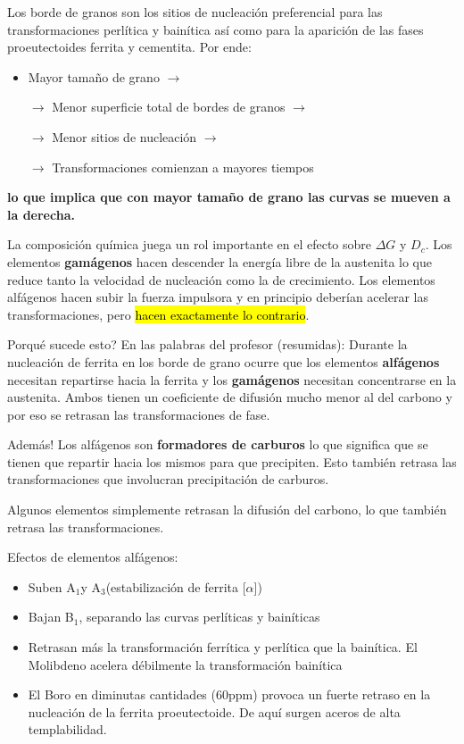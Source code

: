 \documentclass{article}
\newcommand{\Bs}{B\ensuremath{_{1}}}
\newcommand{\Aone}{A\ensuremath{_{1}}}
\newcommand{\Athree}{A\ensuremath{_{3}}}
\newcommand{\goright}{\ensuremath{\rightarrow}}
\begin{document}
Los borde de granos son los sitios de nucleación preferencial para las transformaciones perlítica y bainítica así como para la aparición de las fases proeutectoides ferrita y cementita. Por ende:
\begin{itemize}
    \item Mayor tamaño de grano \goright
    \item[\goright] Menor superficie total de bordes de granos \goright
    \item[\goright] Menor sitios de nucleación \goright
    \item[\goright] Transformaciones comienzan a mayores tiempos
\end{itemize}
\textbf{lo que implica que con mayor tamaño de grano las curvas se mueven a la derecha.}

La composición química juega un rol importante en el efecto sobre $\Delta G$ y $D_c$. Los elementos \textbf{gamágenos} hacen descender la energía libre de la austenita lo que reduce tanto la velocidad de nucleación como la de crecimiento. Los elementos alfágenos hacen subir la fuerza impulsora y en principio deberían acelerar las transformaciones, pero \hl{hacen exactamente lo contrario}.

Porqué sucede esto? En las palabras del profesor (resumidas): Durante la nucleación de ferrita en los borde de grano ocurre que los elementos \textbf{alfágenos} necesitan repartirse hacia la ferrita y los \textbf{gamágenos} necesitan concentrarse en la austenita. Ambos tienen un coeficiente de difusión mucho menor al del carbono y por eso se retrasan las transformaciones de fase.

Además! Los alfágenos son \textbf{formadores de carburos} lo que significa que se tienen que repartir hacia los mismos para que precipiten. Esto también retrasa las transformaciones que involucran precipitación de carburos. 

Algunos elementos simplemente retrasan la difusión del carbono, lo que también retrasa las transformaciones.

Efectos de elementos alfágenos:
\begin{itemize}
    \item Suben \Aone y \Athree (estabilización de ferrita [$\alpha$])
    \item Bajan \Bs, separando las curvas perlíticas y bainíticas
    \item Retrasan más la transformación ferrítica y perlítica que la bainítica. El Molibdeno acelera débilmente la transformación bainítica
    \item El Boro en diminutas cantidades (60ppm) provoca un fuerte retraso en la nucleación de la ferrita proeutectoide. De aquí surgen aceros de alta templabilidad.
\end{itemize}
\end{document}
